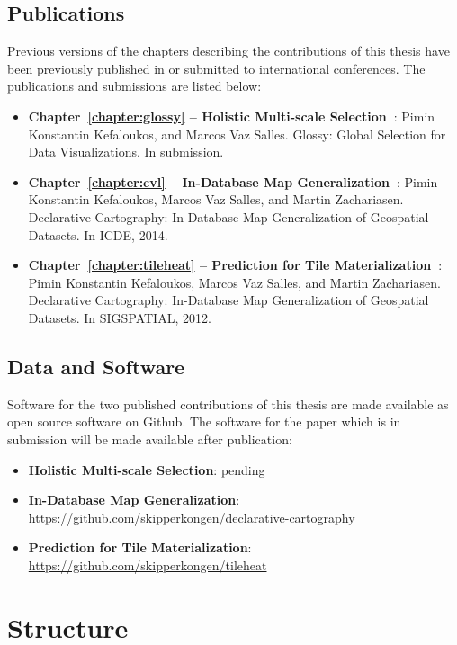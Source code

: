 \documentclass[11pt, oneside]{report}
\begin{document}
{\subsection{Publications}

Previous versions of the chapters describing the contributions of this thesis have been previously published in or submitted to international conferences. The publications and submissions are listed below: 

\begin{itemize}
\item \textbf{Chapter~\ref{chapter:glossy} -- Holistic Multi-scale Selection~\cite{glossy}}: Pimin Konstantin Kefaloukos, and Marcos Vaz Salles. Glossy: Global Selection for Data Visualizations. In submission. 
\item \textbf{Chapter~\ref{chapter:cvl} -- In-Database Map Generalization~\cite{declarative:cartography}}: Pimin Konstantin Kefaloukos, Marcos Vaz Salles, and Martin Zachariasen. Declarative Cartography: In-Database Map Generalization of Geospatial Datasets. In ICDE, 2014. 
\item \textbf{Chapter~\ref{chapter:tileheat} -- Prediction for Tile Materialization~\cite{tileheat}}: Pimin Konstantin Kefaloukos, Marcos Vaz Salles, and Martin Zachariasen. Declarative Cartography: In-Database Map Generalization of Geospatial Datasets. In SIGSPATIAL, 2012. 
\end{itemize}

\subsection{Data and Software}

Software for the two published contributions of this thesis are made available as open source software on Github. The software for the paper which is in submission will be made available after publication:

\begin{itemize}
\item \textbf{Holistic Multi-scale Selection}: pending
\item \textbf{In-Database Map Generalization}: \url{https://github.com/skipperkongen/declarative-cartography}
\item \textbf{Prediction for Tile Materialization}: \url{https://github.com/skipperkongen/tileheat}
\end{itemize}

\section{Structure}
\label{sec:introduction:structure}

}
\end{document}
